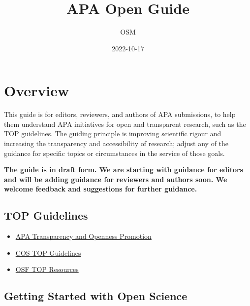 \documentclass[
  oneside]{book}
\title{APA Open Guide}
\author{OSM}
\date{2022-10-17}
\providecommand{\tightlist}{%
  \setlength{\itemsep}{0pt}\setlength{\parskip}{0pt}}
\begin{document}
\maketitle

{
\hypersetup{linkcolor=}
\setcounter{tocdepth}{1}
\tableofcontents
}
\hypertarget{overview}{%
\chapter*{Overview}\label{overview}}

This guide is for editors, reviewers, and authors of APA submissions, to help them understand APA initiatives for open and transparent research, such as the TOP guidelines. The guiding principle is improving scientific rigour and increasing the transparency and accessibility of research; adjust any of the guidance for specific topics or circumstances in the service of those goals.

\textbf{The guide is in draft form. We are starting with guidance for editors and will be adding guidance for reviewers and authors soon. We welcome feedback and suggestions for further guidance.}

\hypertarget{top-guidelines}{%
\section{TOP Guidelines}\label{top-guidelines}}

\begin{itemize}
\tightlist
\item
  \href{https://www.apa.org/pubs/journals/resources/transparency-openness-promotion}{APA Transparency and Openness Promotion}
\item
  \href{https://www.cos.io/initiatives/top-guidelines}{COS TOP Guidelines}
\item
  \href{https://osf.io/9f6gx/}{OSF TOP Resources}
\end{itemize}

\hypertarget{getting-started-with-open-science}{%
\section{Getting Started with Open Science}\label{getting-started-with-open-science}}
\end{document}
